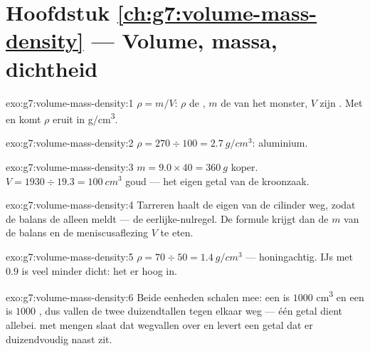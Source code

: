\section*{Hoofdstuk \ref{ch:g7:volume-mass-density} --- Volume, massa, dichtheid}

\begin{solution}{exo:g7:volume-mass-density:1}
$\rho = m/V$: $\rho$ de , $m$ de  van het monster,
$V$ zijn . Met  en  komt $\rho$
eruit in \unit{g/cm^3}.
\end{solution}

\begin{solution}{exo:g7:volume-mass-density:2}
$\rho = 270 \div 100 = \qty{2.7}{g/cm^3}$: aluminium.
\end{solution}

\begin{solution}{exo:g7:volume-mass-density:3}
$m = 9.0 \times 40 = \qty{360}{g}$ koper.
$V = 1930 \div 19.3 = \qty{100}{cm^3}$ goud --- het eigen getal van de
kroonzaak.
\end{solution}

\begin{solution}{exo:g7:volume-mass-density:4}
Tarreren haalt de eigen  van de cilinder weg, zodat de balans de
 alleen meldt --- de eerlijke-nulregel. De formule krijgt dan
de  $m$ van de balans en de meniscusaflezing $V$ te eten.
\end{solution}

\begin{solution}{exo:g7:volume-mass-density:5}
$\rho = 70 \div 50 = \qty{1.4}{g/cm^3}$ --- honingachtig. IJs met
$0.9$ is veel minder dicht: het  er hoog in.
\end{solution}

\begin{solution}{exo:g7:volume-mass-density:6}
Beide eenheden schalen mee: een  is $1000$ \unit{cm^3} en een
 is $1000$ , dus vallen de twee duizendtallen tegen
elkaar weg --- één getal dient allebei.  met  mengen slaat
dat wegvallen over en levert een getal dat er duizendvoudig naast zit.
\end{solution}

